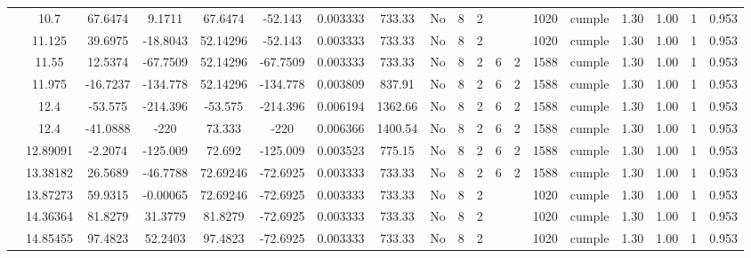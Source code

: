 \begin{table}[H]
{\begin{tabular}{|c|c|c|c|c|c|r|c|c|c|c|c|c|c|c|c|c|c|c|}
\cline{2-19}    & 10.7 & 67.6474 & 9.1711 & 67.6474 & -52.143 & 0.003333 & 733.33 & No  & 8   & 2   &     &     & 1020 & \cellcolor[rgb]{ .776,  .937,  .808}cumple & 1.30 & 1.00 & 1   & 0.953 \bigstrut\\
\cline{2-19}    & 11.125 & 39.6975 & -18.8043 & 52.14296 & -52.143 & 0.003333 & 733.33 & No  & 8   & 2   &     &     & 1020 & \cellcolor[rgb]{ .776,  .937,  .808}cumple & 1.30 & 1.00 & 1   & 0.953 \bigstrut\\
\cline{2-19}    & 11.55 & 12.5374 & -67.7509 & 52.14296 & -67.7509 & 0.003333 & 733.33 & No  & 8   & 2   & 6   & 2   & 1588 & \cellcolor[rgb]{ .776,  .937,  .808}cumple & 1.30 & 1.00 & 1   & 0.953 \bigstrut\\
\cline{2-19}    & 11.975 & -16.7237 & -134.778 & 52.14296 & -134.778 & 0.003809 & 837.91 & No  & 8   & 2   & 6   & 2   & 1588 & \cellcolor[rgb]{ .776,  .937,  .808}cumple & 1.30 & 1.00 & 1   & 0.953 \bigstrut\\
\cline{2-19}    & \cellcolor[rgb]{ .851,  .882,  .949}12.4 & -53.575 & -214.396 & -53.575 & -214.396 & 0.006194 & 1362.66 & No  & 8   & 2   & 6   & 2   & 1588 & \cellcolor[rgb]{ .776,  .937,  .808}cumple & 1.30 & 1.00 & 1   & 0.953 \bigstrut\\
\cline{2-19}    & \cellcolor[rgb]{ .851,  .882,  .949}12.4 & -41.0888 & -220 & 73.333 & -220 & 0.006366 & 1400.54 & No  & 8   & 2   & 6   & 2   & 1588 & \cellcolor[rgb]{ .776,  .937,  .808}cumple & 1.30 & 1.00 & 1   & 0.953 \bigstrut\\
\cline{2-19}    & 12.89091 & -2.2074 & -125.009 & 72.692 & -125.009 & 0.003523 & 775.15 & No  & 8   & 2   & 6   & 2   & 1588 & \cellcolor[rgb]{ .776,  .937,  .808}cumple & 1.30 & 1.00 & 1   & 0.953 \bigstrut\\
\cline{2-19}    & 13.38182 & 26.5689 & -46.7788 & 72.69246 & -72.6925 & 0.003333 & 733.33 & No  & 8   & 2   & 6   & 2   & 1588 & \cellcolor[rgb]{ .776,  .937,  .808}cumple & 1.30 & 1.00 & 1   & 0.953 \bigstrut\\
\cline{2-19}    & 13.87273 & 59.9315 & -0.00065 & 72.69246 & -72.6925 & 0.003333 & 733.33 & No  & 8   & 2   &     &     & 1020 & \cellcolor[rgb]{ .776,  .937,  .808}cumple & 1.30 & 1.00 & 1   & 0.953 \bigstrut\\
\cline{2-19}    & 14.36364 & 81.8279 & 31.3779 & 81.8279 & -72.6925 & 0.003333 & 733.33 & No  & 8   & 2   &     &     & 1020 & \cellcolor[rgb]{ .776,  .937,  .808}cumple & 1.30 & 1.00 & 1   & 0.953 \bigstrut\\
\cline{2-19}    & 14.85455 & 97.4823 & 52.2403 & 97.4823 & -72.6925 & 0.003333 & 733.33 & No  & 8   & 2   &     &     & 1020 & \cellcolor[rgb]{ .776,  .937,  .808}cumple & 1.30 & 1.00 & 1   & 0.953 \bigstrut\\

\end{tabular}}
\end{table}

